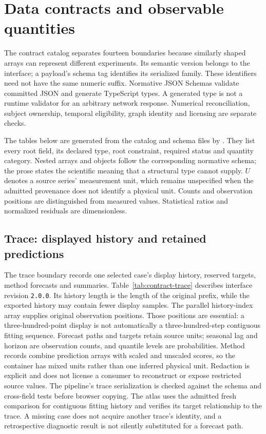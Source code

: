 \section{Data contracts and observable quantities}
\label{sec:data-contracts}

The contract catalog separates fourteen boundaries because similarly shaped arrays can represent different experiments. Its semantic version belongs to the interface; a payload's schema tag identifies its serialized family. These identifiers need not have the same numeric suffix. Normative JSON Schemas validate committed JSON and generate TypeScript types. A generated type is not a runtime validator for an arbitrary network response. Numerical reconciliation, subject ownership, temporal eligibility, graph identity and licensing are separate checks.

The tables below are generated from the catalog and schema files by . They list every root field, its declared type, root constraint, required status and quantity category. Nested arrays and objects follow the corresponding normative schema; the prose states the scientific meaning that a structural type cannot supply. $U$ denotes a source series' measurement unit, which remains unspecified when the admitted provenance does not identify a physical unit. Counts and observation positions are distinguished from measured values. Statistical ratios and normalized residuals are dimensionless.

\subsection{Trace: displayed history and retained predictions}
\label{sec:contract-trace}
The trace boundary records one selected case's display history, reserved targets, method forecasts and summaries. Table~\ref{tab:contract-trace} describes interface revision \texttt{2.0.0}. Its history length is the length of the original prefix, while the exported history may contain fewer display samples. The parallel history-index array supplies original observation positions. Those positions are essential: a three-hundred-point display is not automatically a three-hundred-step contiguous fitting sequence. Forecast paths and targets retain source units; seasonal lag and horizon are observation counts, and quantile levels are probabilities. Method records combine prediction arrays with scaled and unscaled scores, so the container has mixed units rather than one inferred physical unit. Redaction is explicit and does not license a consumer to reconstruct or expose restricted source values. The pipeline's trace serialization is checked against the schema and cross-field tests before browser copying. The atlas uses the admitted fresh comparison for contiguous fitting history and verifies its target relationship to the trace. A missing case does not acquire another trace's identity, and a retrospective diagnostic result is not silently substituted for a forecast path.


